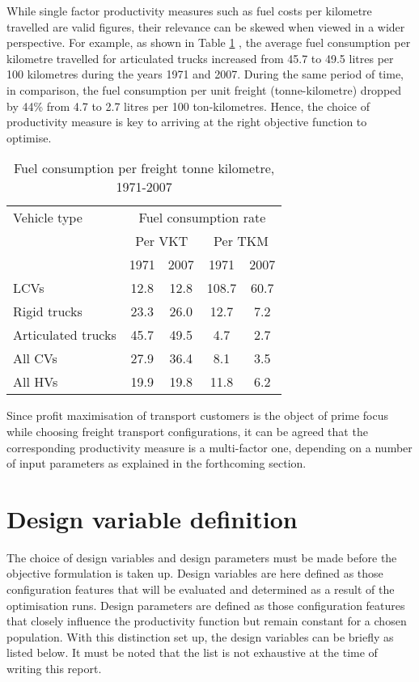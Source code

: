 \documentclass[ExampleMasters.tex]{subfiles}
\begin{document}
		While single factor productivity measures such as fuel costs per kilometre travelled are valid figures, their relevance can be skewed when viewed in a wider perspective. For example, as shown in Table \ref{table:fuelConsumptionRate} \cite[T.~2.8]{TruckProdAus}, the average fuel consumption per kilometre travelled for articulated trucks increased from 45.7 to 49.5 litres per 100 kilometres during the years 1971 and 2007. During the same period of time, in comparison, the fuel consumption per unit freight (tonne-kilometre) dropped by 44\% from 4.7 to 2.7 litres per 100 ton-kilometres. Hence, the choice of productivity measure is key to arriving at the right objective function to optimise.\\

		\begin{table}[ht]
			\centering 
			\begin{tabular}{l c c c c}
  			\hline
			Vehicle type & \multicolumn{4}{c}{Fuel consumption rate}\\ \cline{2-3} \cline{4-5}
			\ & \multicolumn{2}{c}{Per VKT} & \multicolumn{2}{c}{Per TKM}\\ \cline{2-3} \cline{4-5}
			\ & 1971 & 2007 & 1971 & 2007\\ \hline
			    LCVs  & 12.8 & 12.8 & 108.7 & 60.7\\
			    Rigid trucks  & 23.3 & 26.0 & 12.7  & 7.2\\
			    Articulated trucks  & 45.7 & 49.5 & 4.7 & 2.7  \\
			    All CVs  & 27.9 & 36.4 & 8.1 & 3.5 \\
			    All HVs  & 19.9 & 19.8 & 11.8 & 6.2 \\
			\hline 
			\end{tabular}
			\caption{Fuel consumption per freight tonne kilometre, 1971-2007 \cite{TruckProdAus}} 
			\label{table:fuelConsumptionRate} 
		\end{table}

		Since profit maximisation of transport customers is the object of prime focus while choosing freight transport configurations, it can be agreed that the corresponding productivity measure is a multi-factor one, depending on a number of input parameters as explained in the forthcoming section.\\

	\section{Design variable definition}
		The choice of design variables and design parameters must be made before the objective formulation is taken up. Design variables are here defined as those configuration features that will be evaluated and determined as a result of the optimisation runs. Design parameters are defined as those configuration features that closely influence the productivity function but remain constant for a chosen population. With this distinction set up, the design variables can be briefly as listed below. It must be noted that the list is not exhaustive at the time of writing this report.
\end{document}
